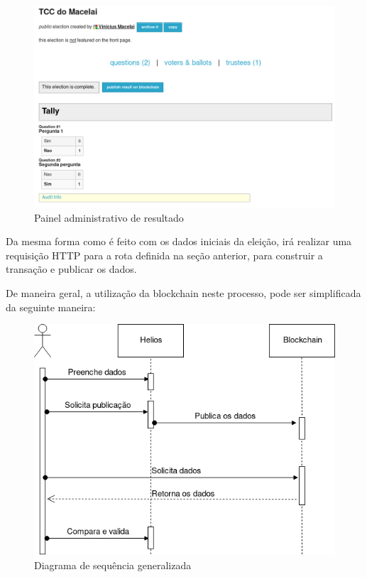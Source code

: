 \documentclass{ufsctex/ufsctex}
\begin{document}
\begin{figure}[H]
	\centering
	\includegraphics[width=\linewidth]{helios-2}
	\caption{Painel administrativo de resultado}
	\label{fig:helios-2}
\end{figure}

Da mesma forma como é feito com os dados iniciais da eleição, irá realizar uma
requisição HTTP para a rota definida na seção anterior, para construir a
transação e publicar os dados.

De maneira geral, a utilização da blockchain neste processo, pode ser
simplificada da seguinte maneira:

\begin{figure}[H]
	\centering
	\includegraphics[width=\linewidth]{voting}
	\caption{Diagrama de sequência generalizada}
	\label{fig:helios-2}
\end{figure}
\end{document}
